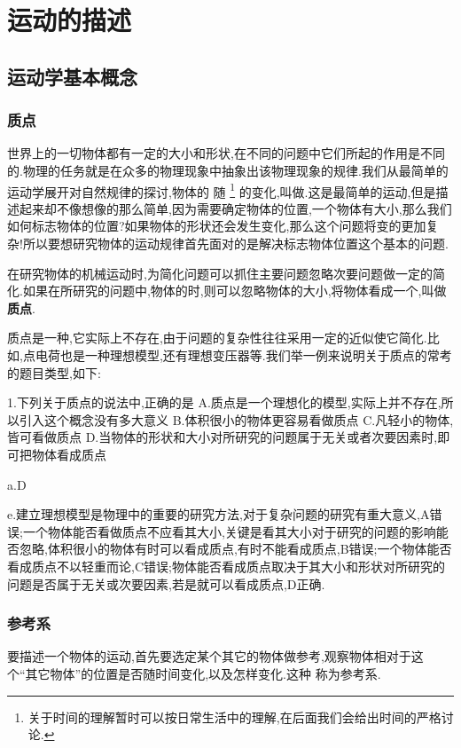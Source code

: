 \chapter{运动的描述}
\section{运动学基本概念}
\subsection{质点}

世界上的一切物体都有一定的大小和形状,在不同的问题中它们所起的作用是不同的.物理的任务就是在众多的物理现象中抽象出该物理现象的规律.我们从最简单的运动学展开对自然规律的探讨,物体的 随 
\footnote{关于时间的理解暂时可以按日常生活中的理解,在后面我们会给出时间的严格讨论.}
的变化,叫做.这是最简单的运动,但是描述起来却不像想像的那么简单,因为需要确定物体的位置,一个物体有大小,那么我们如何标志物体的位置?如果物体的形状还会发生变化,那么这个问题将变的更加复杂!所以要想研究物体的运动规律首先面对的是解决标志物体位置这个基本的问题.

在研究物体的机械运动时,为简化问题可以抓住主要问题忽略次要问题做一定的简化.如果在所研究的问题中,物体的时,则可以忽略物体的大小,将物体看成一个,叫做{\bf 质点}.

质点是一种,它实际上不存在,由于问题的复杂性往往采用一定的近似使它简化.比如,点电荷也是一种理想模型,还有理想变压器等.我们举一例来说明关于质点的常考的题目类型,如下:

\begin{xuanze}[example]
   1.下列关于质点的说法中,正确的是
   A.质点是一个理想化的模型,实际上并不存在,所以引入这个概念没有多大意义
   B.体积很小的物体更容易看做质点
   C.凡轻小的物体,皆可看做质点
   D.当物体的形状和大小对所研究的问题属于无关或者次要因素时,即可把物体看成质点

   a.D

   e.建立理想模型是物理中的重要的研究方法,对于复杂问题的研究有重大意义,A错误;一个物体能否看做质点不应看其大小,关键是看其大小对于研究的问题的影响能否忽略,体积很小的物体有时可以看成质点,有时不能看成质点,B错误;一个物体能否看成质点不以轻重而论,C错误;物体能否看成质点取决于其大小和形状对所研究的问题是否属于无关或次要因素,若是就可以看成质点,D正确.

\end{xuanze}
\subsection{参考系}
要描述一个物体的运动,首先要选定某个其它的物体做参考,观察物体相对于这个``其它物体''的位置是否随时间变化,以及怎样变化.这种  称为参考系.

